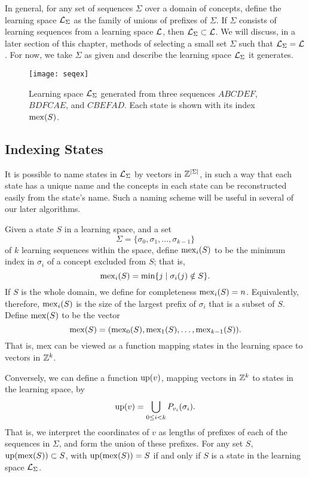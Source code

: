 \documentclass[11pt]{llncs}
\def\Zee{\ensuremath{\Bbb Z}}
\begin{document}
{In general, for any set of sequences $\Sigma$ over a domain of concepts, define the learning space ${\cal L}_\Sigma$ as the family of unions of prefixes of $\Sigma$.
If $\Sigma$ consists of learning sequences from a learning space $\cal L$, then
${\cal L}_\Sigma\subset\cal L$. We will discuss, in a later section of this chapter, methods of selecting a small set $\Sigma$
such that ${\cal L}_\Sigma=\cal L$. For now, we take $\Sigma$ as given and describe the learning space ${\cal L}_\Sigma$ it generates.

\begin{figure}[t]
\centering\texttt{[image: seqex]}
\caption{Learning space ${\cal L}_\Sigma$ generated from three sequences
$ABCDEF$, $BDFCAE$, and $CBEFAD$. Each state is shown with its index ${\rm mex}(S)$.}
\label{fig:seqex}
\end{figure}

\subsection{Indexing States}

It is possible to name states in ${\cal L}_\Sigma$ by vectors in $\Zee^{|\Sigma|}$, in such a way that each state has a unique name and the concepts in each state can be reconstructed easily from the state's name. Such a naming scheme will be useful in several of our later algorithms.

Given a state $S$ in a learning space, and a set
$$\Sigma=\{\sigma_0,\sigma_1,\ldots,\sigma_{k-1}\}$$
of $k$ learning sequences within the space, define ${\rm mex}_i(S)$ to be the minimum index in $\sigma_i$ of a concept excluded from $S$; that is,
$${\rm mex}_i(S)=\min\{j\mid \sigma_i(j)\notin S\}.$$
If $S$ is the whole domain, we define for completeness ${\rm mex}_i(S)=n$. 
Equivalently, therefore, ${\rm mex}_i(S)$ is the size of the largest prefix of $\sigma_i$ that is a subset of $S$.
Define ${\rm mex}(S)$ to be the vector
$${\rm mex}(S)=({\rm mex}_0(S),{\rm mex}_1(S),\ldots,{\rm mex}_{k-1}(S)).$$
That is, {\rm mex} can be viewed as a function mapping states in the learning space to vectors in $\Zee^k$.

Conversely, we can define a function ${\rm up}(v)$, mapping vectors in $\Zee^k$ to states in the learning space, by
$${\rm up}(v)=\bigcup_{0\le i<k} P_{v_i}(\sigma_i).$$
That is, we interpret the coordinates of $v$ as lengths of prefixes of each of the sequences in $\Sigma$, and form the union of these prefixes.  For any set $S$,
${\rm up}({\rm mex}(S))\subset S$, with ${\rm up}({\rm mex}(S))=S$ if and only if $S$ is a state in the learning space ${\cal L}_\Sigma$.

}
\end{document}
